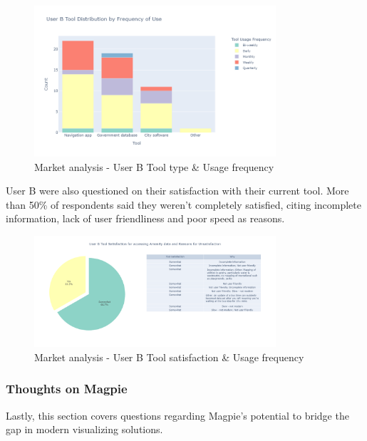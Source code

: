 \begin{figure}[htbp]
    \centering{}
    \includegraphics[width=0.8\textwidth]{images/mr-userb-tool-freq.png}
    \caption{Market analysis - User B Tool type \& Usage frequency}
\end{figure}

User B were also questioned on their satisfaction with their current tool. More
than 50\% of respondents said they weren't completely satisfied, citing
incomplete information, lack of user friendliness and poor speed as reasons.

\begin{figure}[htbp]
    \centering{}
    \includegraphics[width=0.8\textwidth]{images/mr-userb-tool-satisfaction.png}
    \caption{Market analysis - User B Tool satisfaction \& Usage frequency}
\end{figure}

\subsubsection{Thoughts on Magpie}
Lastly, this section covers questions regarding Magpie's potential to bridge the
gap in modern visualizing solutions.

